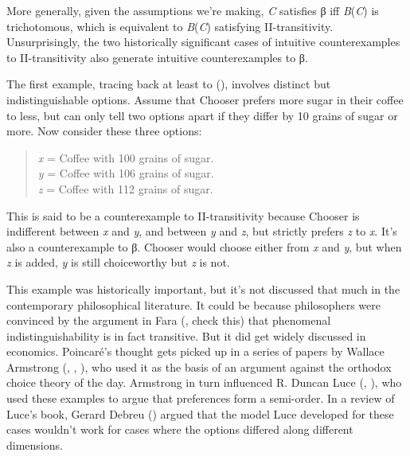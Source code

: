 \documentclass[
  11pt,
  letterpaper,
  DIV=11,
  numbers=noendperiod,
  twoside]{scrartcl}
\begin{document}
More generally, given the assumptions we're making, \emph{C} satisfies β
iff \emph{B}(\emph{C}) is trichotomous, which is equivalent to
\emph{B}(\emph{C}) satisfying II-transitivity. Unsurprisingly, the two
historically significant cases of intuitive counterexamples to
II-transitivity also generate intuitive counterexamples to β.

The first example, tracing back at least to
(), involves distinct
but indistinguishable options. Assume that Chooser prefers more sugar in
their coffee to less, but can only tell two options apart if they differ
by 10 grains of sugar or more. Now consider these three options:

\begin{quote}
\emph{x} = Coffee with 100 grains of sugar.\\
\emph{y} = Coffee with 106 grains of sugar.\\
\emph{z} = Coffee with 112 grains of sugar.
\end{quote}

This is said to be a counterexample to II-transitivity because Chooser
is indifferent between \emph{x} and \emph{y}, and between \emph{y} and
\emph{z}, but strictly prefers \emph{z} to \emph{x}. It's also a
counterexample to β. Chooser would choose either from \emph{x} and
\emph{y}, but when \emph{z} is added, \emph{y} is still choiceworthy but
\emph{z} is not.

This example was historically important, but it's not discussed that
much in the contemporary philosophical literature. It could be because
philosophers were convinced by the argument in Fara
(, check this) that phenomenal
indistinguishability is in fact transitive. But it did get widely
discussed in economics. Poincaré's thought gets picked up in a series of
papers by Wallace Armstrong (,
, ),
who used it as the basis of an argument against the orthodox choice
theory of the day. Armstrong in turn influenced R. Duncan Luce
(, ), who used
these examples to argue that preferences form a semi-order. In a review
of Luce's book, Gerard Debreu () argued
that the model Luce developed for these cases wouldn't work for cases
where the options differed along different dimensions.
\end{document}
